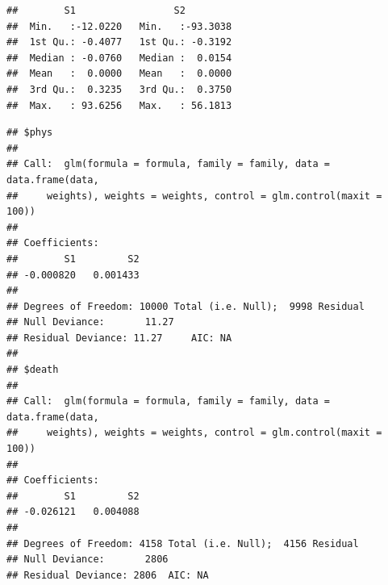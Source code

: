 \documentclass[
]{book}
\newenvironment{Shaded}{\begin{snugshade}}{\end{snugshade}}
\newcommand{\CommentTok}[1]{\textcolor[rgb]{0.56,0.35,0.01}{\textit{#1}}}
\newcommand{\DocumentationTok}[1]{\textcolor[rgb]{0.56,0.35,0.01}{\textbf{\textit{#1}}}}
\newcommand{\FunctionTok}[1]{\textcolor[rgb]{0.13,0.29,0.53}{\textbf{#1}}}
\newcommand{\NormalTok}[1]{#1}
\newcommand{\SpecialCharTok}[1]{\textcolor[rgb]{0.81,0.36,0.00}{\textbf{#1}}}
\begin{document}
\begin{Shaded}
\end{Shaded}

\begin{verbatim}
##        S1                 S2          
##  Min.   :-12.0220   Min.   :-93.3038  
##  1st Qu.: -0.4077   1st Qu.: -0.3192  
##  Median : -0.0760   Median :  0.0154  
##  Mean   :  0.0000   Mean   :  0.0000  
##  3rd Qu.:  0.3235   3rd Qu.:  0.3750  
##  Max.   : 93.6256   Max.   : 56.1813
\end{verbatim}

\begin{Shaded}
\end{Shaded}

\begin{verbatim}
## $phys
## 
## Call:  glm(formula = formula, family = family, data = data.frame(data, 
##     weights), weights = weights, control = glm.control(maxit = 100))
## 
## Coefficients:
##        S1         S2  
## -0.000820   0.001433  
## 
## Degrees of Freedom: 10000 Total (i.e. Null);  9998 Residual
## Null Deviance:       11.27 
## Residual Deviance: 11.27     AIC: NA
## 
## $death
## 
## Call:  glm(formula = formula, family = family, data = data.frame(data, 
##     weights), weights = weights, control = glm.control(maxit = 100))
## 
## Coefficients:
##        S1         S2  
## -0.026121   0.004088  
## 
## Degrees of Freedom: 4158 Total (i.e. Null);  4156 Residual
## Null Deviance:       2806 
## Residual Deviance: 2806  AIC: NA
\end{verbatim}
\end{document}
